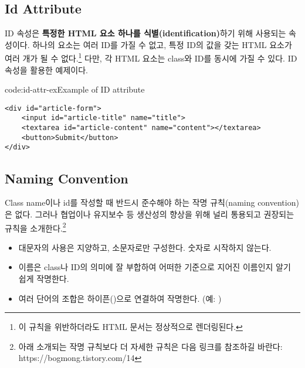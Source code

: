 \subsection*{Id Attribute}
ID 속성은 \textbf{특정한 HTML 요소 하나를 식별(identification)}하기 위해 사용되는 속성이다. 하나의 요소는 여러 ID를 가질 수 없고, 특정 ID의 값을 갖는 HTML 요소가 여러 개가 될 수 없다.\footnote{이 규칙을 위반하더라도 HTML 문서는 정상적으로 렌더링된다.} 다만, 각 HTML 요소는 class와 ID를 동시에 가질 수 있다. \은 ID 속성을 활용한 예제이다.

\begin{codeenv}{code:id-attr-ex}{Example of ID attribute}\begin{verbatim}
<div id="article-form">
    <input id="article-title" name="title">
    <textarea id="article-content" name="content"></textarea>
    <button>Submit</button>
</div>
\end{verbatim}
\end{codeenv}

\subsection*{Naming Convention}
Class name이나 id를 작성할 때 반드시 준수해야 하는 작명 규칙(naming convention)은 없다. 그러나 협업이나 유지보수 등 생산성의 향상을 위해 널리 통용되고 권장되는 규칙을 소개한다.\footnote{아래 소개되는 작명 규칙보다 더 자세한 규칙은 다음 링크를 참조하길 바란다: https://bogmong.tistory.com/14}

\begin{itemize}
    \item 대문자의 사용은 지양하고, 소문자로만 구성한다. 숫자로 시작하지 않는다.
    \item 이름은 class나 ID의 의미에 잘 부합하여 어떠한 기준으로 지어진 이름인지 알기 쉽게 작명한다.
    \item 여러 단어의 조합은 하이픈(\cd{-})으로 연결하여 작명한다. (예: )
\end{itemize}
